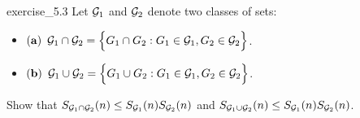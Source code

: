 \begin{exercise}{}{exercise_5.3}
    Let $\mathcal{G}_1$ and $\mathcal{G}_2$ denote two classes of sets:
    \begin{itemize}
        \item ${\bf (a)}$ $\mathcal{G}_1 \cap \mathcal{G}_2=\Big\{ G_1\cap G_2: G_1\in\mathcal{G}_1, G_2 \in\mathcal{G}_2 \Big\}$.
        \item ${\bf (b)}$ $\mathcal{G}_1 \cup \mathcal{G}_2=\Big\{ G_1\cup G_2: G_1\in\mathcal{G}_1, G_2 \in\mathcal{G}_2 \Big\}$.
    \end{itemize}

    Show that $S_{\mathcal{G}_1\cap\mathcal{G}_2}(n) \le S_{\mathcal{G}_1}(n)S_{\mathcal{G}_2}(n)$ and $S_{\mathcal{G}_1\cup\mathcal{G}_2}(n) \le S_{\mathcal{G}_1}(n)S_{\mathcal{G}_2}(n)$.
\end{exercise}

\begin{solution*}
    
\end{solution*}

